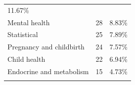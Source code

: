 \documentclass[]{article}
\begin{document}
\begin{longtable}[]{@{}lll@{}}
\begin{minipage}[t]{0.18\columnwidth}
11.67\%\strut
\end{minipage}\tabularnewline
\begin{minipage}[t]{0.34\columnwidth}\raggedright
Mental health\strut
\end{minipage} & \begin{minipage}[t]{0.18\columnwidth}\raggedright
28\strut
\end{minipage} & \begin{minipage}[t]{0.18\columnwidth}\raggedright
8.83\%\strut
\end{minipage}\tabularnewline
\begin{minipage}[t]{0.34\columnwidth}\raggedright
Statistical\strut
\end{minipage} & \begin{minipage}[t]{0.18\columnwidth}\raggedright
25\strut
\end{minipage} & \begin{minipage}[t]{0.18\columnwidth}\raggedright
7.89\%\strut
\end{minipage}\tabularnewline
\begin{minipage}[t]{0.34\columnwidth}\raggedright
Pregnancy and childbirth\strut
\end{minipage} & \begin{minipage}[t]{0.18\columnwidth}\raggedright
24\strut
\end{minipage} & \begin{minipage}[t]{0.18\columnwidth}\raggedright
7.57\%\strut
\end{minipage}\tabularnewline
\begin{minipage}[t]{0.34\columnwidth}\raggedright
Child health\strut
\end{minipage} & \begin{minipage}[t]{0.18\columnwidth}\raggedright
22\strut
\end{minipage} & \begin{minipage}[t]{0.18\columnwidth}\raggedright
6.94\%\strut
\end{minipage}\tabularnewline
\begin{minipage}[t]{0.34\columnwidth}\raggedright
Endocrine and metabolism\strut
\end{minipage} & \begin{minipage}[t]{0.18\columnwidth}\raggedright
15\strut
\end{minipage} & \begin{minipage}[t]{0.18\columnwidth}\raggedright
4.73\%\strut
\end{minipage}\tabularnewline
\begin{minipage}[t]{0.34\columnwidth}\raggedright

\end{minipage}
\end{longtable}
\end{document}
